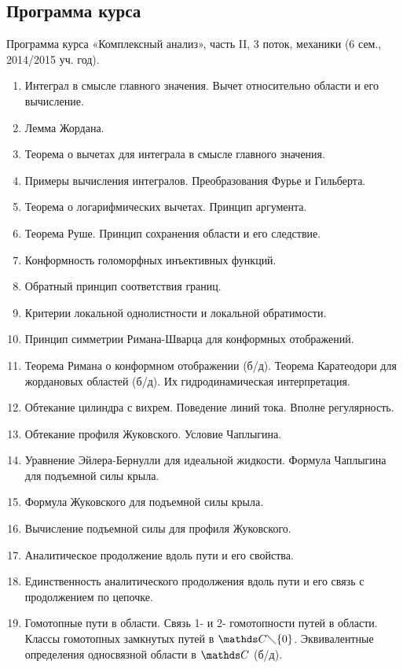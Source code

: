 
 \subsection{Программа курса} 
 Программа курса «Комплексный анализ», часть II, 3 поток, механики (6 сем., 2014/2015 уч. год).
\begin{enumerate}
\item   Интеграл в смысле главного значения. Вычет относительно области и его   
      вычисление. 
\item Лемма Жордана.
\item   Теорема о вычетах для интеграла в смысле главного значения. 
\item   Примеры вычисления интегралов. Преобразования Фурье и Гильберта. 
\item  Теорема о логарифмических вычетах. Принцип аргумента. 
\item  Теорема Руше. Принцип сохранения области и его следствие.
\item  Конформность голоморфных инъективных функций.
\item  Обратный принцип соответствия границ.
\item   Критерии локальной однолистности и локальной обратимости.
\item Принцип симметрии Римана-Шварца для конформных отображений.
\item Теорема Римана о конформном отображении (б/д). Теорема Каратеодори 
      для жордановых областей (б/д). Их гидродинамическая интерпретация.
\item Обтекание цилиндра с вихрем. Поведение линий тока. Вполне 
      регулярность.
\item Обтекание профиля Жуковского. Условие Чаплыгина.
\item Уравнение Эйлера-Бернулли для идеальной жидкости. Формула 
      Чаплыгина для подъемной силы крыла.
\item Формула Жуковского для подъемной силы крыла.
\item Вычисление подъемной силы для профиля Жуковского.
\item Аналитическое продолжение вдоль пути и его свойства. 
\item Единственность аналитического продолжения вдоль пути и его связь с 
      продолжением по цепочке.
\item Гомотопные пути в области.  Связь 1- и 2- гомотопности путей в области. 
      Классы гомотопных замкнутых путей в  $\C \diagdown \{0\}$. Эквивалентные 
      определения односвязной области в  $\C$ (б/д).

\end{enumerate}

